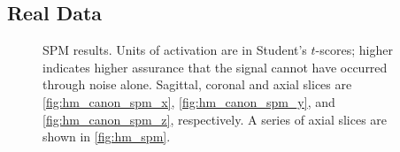 \documentclass[journal]{./IEEEtran}
\begin{document}
\subsection{Real Data}
\begin{figure}
\centering
{}
\caption{SPM results. Units of activation are in Student's $t$-scores; higher indicates higher
        assurance that the signal cannot have occurred through noise alone.
        Sagittal, coronal and axial slices  are
        \autoref{fig:hm_canon_spm_x}, \autoref{fig:hm_canon_spm_y}, and
         \autoref{fig:hm_canon_spm_z}, respectively. A series of axial slices are
         shown in \autoref{fig:hm_spm}. }
\label{fig:hm_canon_spm}
\end{figure}
\end{document}
